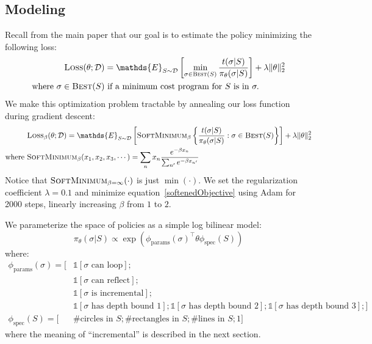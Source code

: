 \documentclass{article}
\newcommand{\indicator}{\mathds{1}} %
\newcommand{\expect}{\mathds{E}} %
\begin{document}
\subsection{Modeling}\label{searchPolicyModel}
Recall from the main paper that our goal is to estimate the policy minimizing the following loss:
\begin{align}
\textsc{Loss}(\theta ; \mathcal{D})& =  \expect_{S\sim\mathcal{D}}\left[ \min_{\sigma\in \text{\textsc{Best}}(S)}\frac{t(\sigma | S)}{\pi_\theta (\sigma | S)}\right] + \lambda \Vert\theta\Vert_2^2\label{policyLoss}\\
\text{where }  \sigma \in\text{\textsc{Best}}(S) &\text{ if  a minimum cost program for }S \text{ is in }\sigma .\nonumber %
\end{align}
We make this optimization problem tractable by annealing our loss function during gradient descent:
\begin{align}
&  \textsc{Loss}_\beta(\theta ; \mathcal{D}) =  \expect_{S\sim\mathcal{D}}\left[ \textsc{SoftMinimum}_\beta \left\{
    \frac{t(\sigma | S)}{\pi_\theta (\sigma | S)}    : \sigma\in \text{\textsc{Best}}(S)\right\}\right] + \lambda \Vert\theta\Vert_2^2\label{softenedObjective}\\
  \text{where }&\textsc{SoftMinimum}_\beta (x_1,x_2,x_3,\cdots ) = \sum_n x_n  \frac{e^{-\beta x_n}}{\sum_{n'}e^{-\beta x_{n'}}}
\end{align}
Notice that $\textsc{SoftMinimum}_{\beta = \infty}(\cdot )$ is just $\min(\cdot )$.
We set the regularization coefficient $\lambda = 0.1$ and minimize equation~\ref{softenedObjective}
using Adam for 2000 steps, linearly increasing $\beta$ from $1$ to $2$.

We parameterize the space of policies as a simple log bilinear model:
\begin{equation}
  \pi_{\theta}(\sigma |S)\propto \exp \left( \phi_{\text{params}}(\sigma )^\top\theta \phi_{\text{spec}}(S)\right)
\end{equation}
where:
\begin{align*}
  \phi_{\text{params}}(\sigma ) = [&\indicator [\sigma \text{ can loop}] ;\\
    &\indicator [\sigma \text{ can reflect}];\\
    &\indicator [\sigma \text{ is incremental}] ; \\
    &\indicator [\sigma \text{ has depth bound }1];\indicator [\sigma \text{ has depth bound }2];\indicator [\sigma \text{ has depth bound }3];]\\
  \phi_{\text{spec}}(S) = [&\text{\# circles in }S;\text{\# rectangles in }S;\text{\# lines in }S;1]
  \end{align*}
where the meaning of ``incremental'' is described in the next section.
\end{document}
